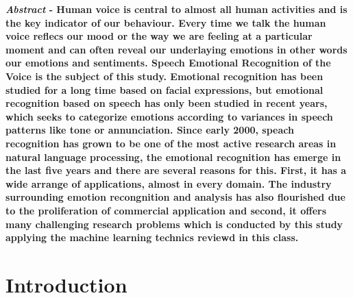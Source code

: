 \documentclass[acmsmall,nonacm,natbib=false]{acmart}
\begin{document}


\maketitle
\textbf{\textit{Abstract} -
Human voice is central to almost all human activities and is the key indicator of our behaviour. Every time we talk the human voice reflecs our mood or the way we are feeling at a particular moment and can often reveal our underlaying emotions in other words our emotions and sentiments. Speech Emotional Recognition of the Voice is the subject of this study. Emotional recognition has been studied for a long time based on facial expressions, but emotional recognition based on speech has only been
studied in recent years, which seeks to categorize emotions according to variances in speech patterns like tone or annunciation. Since early 2000, speach recognition has grown to be one of the most active research areas in natural language processing, the emotional recognition has emerge in the last five years and there are several reasons for this. First, it has a wide
arrange of applications, almost in every domain. The industry surrounding emotion recongnition and analysis has also flourished due to the proliferation of commercial application and second, it offers many challenging research problems which is conducted by this study applying the machine learning technics reviewd in this class.}
\section{Introduction}

\printbibliography

\end{document}
